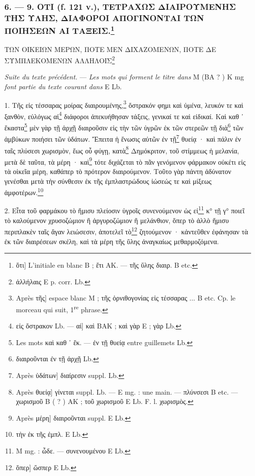 \documentclass[a4paper, 11pt, oneside, polutonikogreek, french]{article}
\begin{document}
\bigskip
\centerline{\EightStarTaper}
\centerline{\EightStarTaper\EightStarTaper}
\bigskip

\subsubsection[6. --- 9. ΟΤΙ (f. 121 v.), ΤΕΤΡΑΧΩΣ ΔΙΑΙΡΟΥΜΕΝΗΣ ΤΗΣ ΥΛΗΣ, ΔΙΑΦΟΡΟΙ ΑΠΟΓΙΝΟΝΤΑΙ ΤΩΝ ΠΟΙΗΣΕΩΝ ΑΙ ΤΑΞΕΙΣ.]{6. --- 9. ΟΤΙ (f. 121 v.), ΤΕΤΡΑΧΩΣ ΔΙΑΙΡΟΥΜΕΝΗΣ ΤΗΣ ΥΛΗΣ, ΔΙΑΦΟΡΟΙ ΑΠΟΓΙΝΟΝΤΑΙ ΤΩΝ ΠΟΙΗΣΕΩΝ ΑΙ ΤΑΞΕΙΣ.\footnote{ὅτι] L'initiale en blanc B ; ἔτι AK. --- τῆς ὕλης διαιρ. B etc.}}

ΤΩΝ ΟΙΚΕΙΩΝ ΜΕΡΩΝ, ΠΟΤΕ ΜΕΝ ΔΙΧΑΖΟΜΕΝΩΝ, ΠΟΤΕ ΔΕ ΣΥΜΠΛΕΚΟΜΕΝΩΝ ΑΛΛΗΛΟΙΣ\footnote{ἀλλήλαις E p. corr. Lb.}

\emph{Suite du texte précédent.} --- \emph{Les mots qui forment le titre dans} M (BA ? ) K mg \emph{font partie du texte courant dans} E Lb.

\bigskip

1. Τῆς      εἰς τέσσαρας μοίρας διαιρουμένης,\footnote{Après τῆς] espace blanc M ; τῆς ὀρνιθογονίας εἰς τέσσαρας ... B etc. Cp. le morceau qui suit, 1\textsuperscript{re} phrase.} ὄστρακόν φημι καὶ ὑμένα, λευκόν τε καὶ ξανθὸν, εὐλόγως αἱ\footnote{εἰς ὄστρακον Lb. --- αἰ] καὶ BAK ; καὶ γὰρ E ; γὰρ Lb.} διάφοροι ἀπεκυήθησαν τάξεις, γενικαί τε καὶ εἰδικαί. Καὶ καθ ᾽ ἕκαστα\footnote{Les mots καὶ καθ ᾽ ἕκ. --- ἐν τῇ θυείᾳ entre guillemets Lb.} μὲν γὰρ τῇ ἀρχῇ διαιροῦσιν εἰς τὴν τῶν ὑγρῶν ἐκ τῶν στερεῶν τῇ διὰ\footnote{διαιροῦνται ἐν τῇ ἀρχῇ Lb.} τῶν ἀμβύκων ποιήσει τῶν ὑδάτων. Ἔπειτα ἡ ἕνωσις αὐτῶν ἐν τῇ\footnote{Après ὑδάτων] διαίρεσιν suppl. Lb.} θυείᾳ · καὶ πάλιν ἐν ταῖς πλύσεσι χωρισμὸν, ἕως οὗ φύγῃ, κατὰ\footnote{Après θυείᾳ] γίνεται suppl. Lb. --- E mg. : une main. --- πλύνσεσι B etc. --- χωρισμοῦ B ( ? ) AK ; τοῦ χωρισμοῦ E Lb. F. l. χωρισμὸς.} Δημόκριτον, τοῦ στίμμεως ἡ μελανία, μετὰ δὲ ταῦτα, τὰ μέρη · καὶ\footnote{Après μέρη] διαιροῦνται suppl. E Lb.} τότε διχάζεται τὸ πᾶν γενόμενον φάρμακον οὐκέτι εἰς τὰ οἰκεῖα μέρη, καθάπερ τὸ πρότερον διαιρούμενον. Τοῦτο γὰρ πάντη ἀδύνατον γενέσθαι μετὰ τὴν σύνθεσιν ἐκ τῆς ἐμπλαστρώδους ἰώσεώς τε καὶ μίξεως ἀμφοτέρων.\footnote{τὴν ἐκ τῆς ἐμπλ. E Lb.}

2. Εἶτα τοῦ φαρμάκου τὸ ἥμισυ πλείοσιν ὑγροῖς συνενούμενον ὡς εἰ\footnote{M mg. : ὧδε. --- συνενουμένου E Lb.} κ° τῇ γ° ποιεῖ τὸ καλούμενον χρυσοζώμιον ἢ ἀργυροζώμιον ἢ μελάνθιον, ὅπερ τὸ ἀλλὸ ἥμισυ περιπλακὲν ταῖς ἄγαν λειώσεσιν, ἀποτελεῖ τὸ\footnote{ὅπερ] ὥσπερ E Lb.} ζητούμενον · κἀντεῦθεν ἐφάνησαν τὰ ἐκ τῶν διαιρέσεων σκέλη, καὶ τὰ μέρη τῆς ὕλης ἀναγκαίως μεθαρμοζόμενα.
\end{document}
